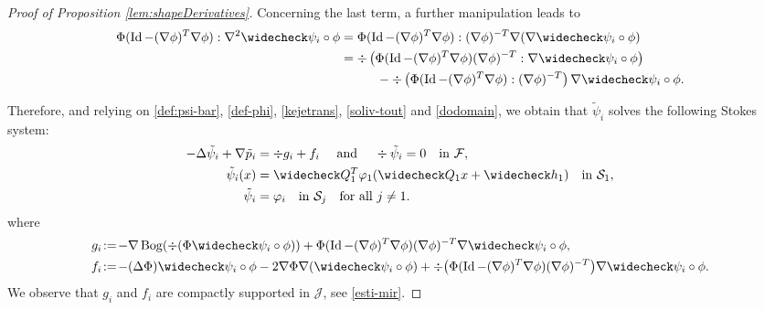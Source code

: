 \documentclass[10pt]{amsart}
\DeclareMathOperator{\Bog}{Bog}
\DeclareMathOperator{\Id}{Id}
\theoremstyle{definition}
\theoremstyle{remark}
\begin{document}
\begin{proof}[Proof of Proposition \ref{lem:shapeDerivatives}]
Concerning the last term, a further manipulation leads to
\begin{align*}
\Phi (\Id - (\nabla \phi)^T \nabla \phi) : \nabla^2 \widecheck \psi_i \circ \phi &= \Phi (\Id - (\nabla \phi)^T\nabla \phi) :(\nabla \phi)^{-T} \nabla(\nabla \widecheck \psi_i \circ \phi) \\
&= \div \left(\Phi (\Id - (\nabla \phi)^T \nabla \phi) (\nabla \phi)^{-T} : \nabla \widecheck \psi_i \circ \phi \right) \\
&\hspace*{1cm} - \div\left(\Phi (\Id - (\nabla \phi)^T\nabla \phi) : (\nabla \phi)^{-T} \right) \nabla \widecheck \psi_i \circ \phi.
\end{align*}

Therefore, and relying on \eqref{def:psi-bar}, \eqref{def-phi}, \eqref{kejetrans}, \eqref{soliv-tout} and
\eqref{dodomain},
we obtain that $\tilde \psi_i$ solves the following Stokes system:
\begin{subequations}
\label{subtilde}
\begin{align}
- \Delta \tilde \psi_i + \nabla \tilde p_i &= \div g_i + f_i \quad \text{ and } \quad \div \tilde \psi_i = 0 \quad \text{in } \mathcal F, \\
\tilde \psi_i (x) &= \widecheck Q_1^T \varphi_1(\widecheck Q_1 x + \widecheck h_1) \quad \text{in } \mathcal S_1, \\
\tilde \psi_i &= \varphi_i \quad \text{in } \mathcal S_j \quad \text{for all } j \neq 1.
\end{align}
\end{subequations}
where
\begin{align}
g_i &\!:=\! - \nabla \Bog (\div (\Phi \widecheck \psi_i \circ \phi)) + \Phi (\Id - (\nabla \phi)^T\nabla \phi) (\nabla \phi)^{-T} \nabla \widecheck \psi_i \circ \phi, \label{def:g_i}\\
f_i &\!:=\! -(\Delta \Phi) \widecheck \psi_i \circ \phi - 2 \nabla \Phi \nabla (\widecheck \psi_i \circ \phi)
+ \div\bigl(\Phi (\Id - (\nabla \phi)^T\nabla \phi) (\nabla \phi)^{-T} \bigr) \nabla \widecheck \psi_i \circ \phi. \label{def:f_i}
\end{align}
We observe that $g_i$ and $f_i$ are compactly supported in $ \mathcal J$, see \eqref{esti-mir}.


\end{proof}
\end{document}
